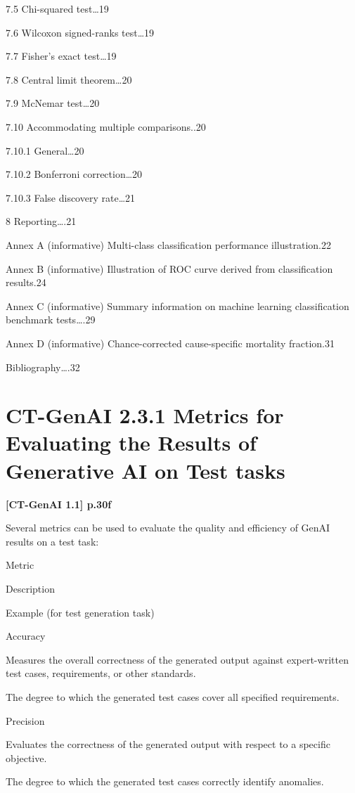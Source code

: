 \documentclass[
  letterpaper,
  DIV=11,
  numbers=noendperiod,
  oneside]{scrreprt}
\begin{document}
\begin{tcolorbox}
7.5 Chi-squared test\ldots19

7.6 Wilcoxon signed-ranks test\ldots19

7.7 Fisher's exact test\ldots19

7.8 Central limit theorem\ldots20

7.9 McNemar test\ldots20

7.10 Accommodating multiple comparisons..20

7.10.1 General\ldots20

7.10.2 Bonferroni correction\ldots20

7.10.3 False discovery rate\ldots21

8 Reporting\ldots.21

Annex A (informative) Multi-class classification performance
illustration.22

Annex B (informative) Illustration of ROC curve derived from
classification results.24

Annex C (informative) Summary information on machine learning
classification benchmark tests\ldots.29

Annex D (informative) Chance-corrected cause-specific mortality
fraction.31

Bibliography\ldots.32

\chapter{CT-GenAI 2.3.1 Metrics for Evaluating the Results of Generative
AI on Test
tasks}\label{ct-genai-2.3.1-metrics-for-evaluating-the-results-of-generative-ai-on-test-tasks}

\textbf{{[}CT-GenAI 1.1{]} p.30f}

Several metrics can be used to evaluate the quality and efficiency of
GenAI{} results on a test task:

Metric

Description

Example (for test generation task)

Accuracy

Measures the overall correctness of the generated output against
expert-written test cases, requirements, or other standards.

The degree to which the generated test cases cover all specified
requirements.

Precision

Evaluates the correctness of the generated output with respect to a
specific objective.

The degree to which the generated test cases correctly identify
anomalies.


\end{tcolorbox}
\end{document}
